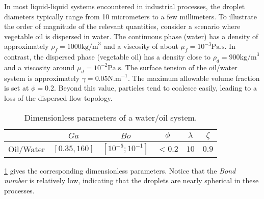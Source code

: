 In most liquid-liquid systems encountered in industrial processes, the droplet diameters typically range from 10 micrometers to a few millimeters. To illustrate the order of magnitude of the relevant quantities, consider a scenario where vegetable oil is dispersed in water. The continuous phase (water) has a density of approximately $\rho_f = 1000 \text{kg/m}^3$ and a viscosity of about $\mu_f = 10^{-3} \text{Pa.s}$. In contrast, the dispersed phase (vegetable oil) has a density close to $\rho_d = 900 \text{kg/m}^3$ and a viscosity around $\mu_d = 10^{-2} \text{Pa.s}$.
The surface tension of the oil/water system is approximately $\gamma = 0.05 \text{N.m}^{-1}$. The maximum allowable volume fraction is set at $\phi = 0.2$. Beyond this value, particles tend to coalesce easily, leading to a loss of the dispersed flow topology.%
\begin{table}[h!]
    \centering
    \caption{Dimensionless parameters of a water/oil system.}
    \begin{tabular}{|c||c|c|c|c|c|}
        \hline&$Ga$&$Bo$&$\phi$&$\lambda$&$\zeta$\\ \hline
        \hline Oil/Water&$[0.35,160]$&$[10^{-5};10^{-1}]$&$<0.2$&$10$&$0.9$\\ \hline
    \end{tabular}
    \label{tab:parameters_exp}
\end{table}
\ref{tab:parameters_exp} gives the corresponding dimensionless parameters.  
Notice that the \textit{Bond number} is relatively low, indicating that the droplets are nearly spherical in these processes.
